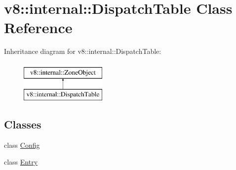\hypertarget{classv8_1_1internal_1_1DispatchTable}{}\section{v8\+:\+:internal\+:\+:Dispatch\+Table Class Reference}
\label{classv8_1_1internal_1_1DispatchTable}
Inheritance diagram for v8\+:\+:internal\+:\+:Dispatch\+Table\+:\begin{figure}[H]
\begin{center}
\leavevmode
\includegraphics[height=2.000000cm]{classv8_1_1internal_1_1DispatchTable}
\end{center}
\end{figure}
\subsection*{Classes}
\begin{DoxyCompactItemize}
\item 
class \mbox{\hyperlink{classv8_1_1internal_1_1DispatchTable_1_1Config}{Config}}
\item 
class \mbox{\hyperlink{classv8_1_1internal_1_1DispatchTable_1_1Entry}{Entry}}
\end{DoxyCompactItemize}
